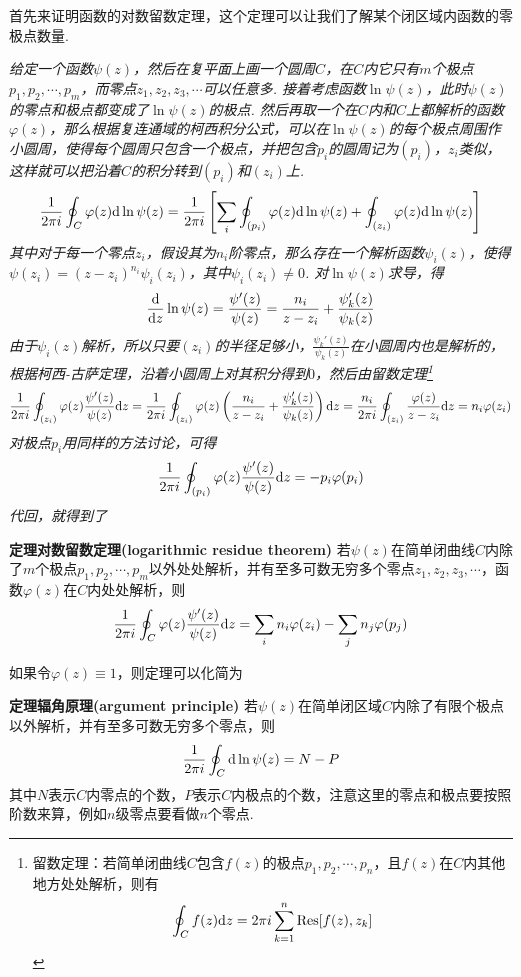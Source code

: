 \documentclass[UTF8]{ctexart}
\newcommand{\trm}[1]{{\rm #1}}
\newenvironment{theorem}[1]
    {\begin{tcolorbox}[enhanced, colback=LightYellow, breakable=true, frame hidden, borderline west={1.5mm}{-2mm}{DarkBlue}]
    {\bfseries {\color{DarkBlue} 定理}\quad #1} \newline}
    {\end{tcolorbox}}
\begin{document}
首先来证明函数的对数留数定理，这个定理可以让我们了解某个闭区域内函数的零极点数量.

\textit{
给定一个函数\(\psi(z)\)，然后在复平面上画一个圆周\(C\)，在\(C\)内它只有\(m\)个极点\(p_1, p_2, \cdots, p_m\)，而零点\(z_1, z_2, z_3, \cdots\)可以任意多. 接着考虑函数\(\ln\psi(z)\)，此时\(\psi(z)\)的零点和极点都变成了\(\ln\psi(z)\)的极点. 然后再取一个在\(C\)内和\(C\)上都解析的函数\(\varphi(z)\)，那么根据复连通域的柯西积分公式，可以在\(\ln\psi(z)\)的每个极点周围作小圆周，使得每个圆周只包含一个极点，并把包含\(p_i\)的圆周记为\((p_i)\)，\(z_i\)类似，这样就可以把沿着\(C\)的积分转到\((p_i)\)和\((z_i)\)上.
\[\frac{1}{2\pi i}\oint_{C}\varphi(z)\trm{d}\ln\psi(z) = \frac{1}{2\pi i}\left[\sum_{i}\oint_{(p_i)}\varphi(z)\trm{d}\ln\psi(z)+\oint_{(z_i)}\varphi(z)\trm{d}\ln\psi(z)\right]\]
其中对于每一个零点\(z_i\)，假设其为\(n_i\)阶零点，那么存在一个解析函数\(\psi_i(z)\)，使得\(\psi(z_i) = (z-z_i)^{n_i}\psi_i(z_i)\)，其中\(\psi_i(z_i)\neq 0\). 对\(\ln\psi(z)\)求导，得
\[\frac{\trm{d}}{\trm{d}z}\ln\psi(z) = \frac{\psi'(z)}{\psi(z)} = \frac{n_i}{z-z_i}+\frac{\psi_k'(z)}{\psi_k(z)}\]
由于\(\psi_i(z)\)解析，所以只要\((z_i)\)的半径足够小，\(\frac{\psi_k'(z)}{\psi_k(z)}\)在小圆周内也是解析的，根据柯西-古萨定理，沿着小圆周上对其积分得到\(0\)，然后由留数定理\footnote{留数定理：若简单闭曲线\(C\)包含\(f(z)\)的极点\(p_1, p_2, \cdots, p_n\)，且\(f(z)\)在\(C\)内其他地方处处解析，则有
\[\oint_C f(z)\trm{d}z = 2\pi i\sum_{k=1}^{n}\trm{Res}[f(z),z_k]\]}
\[\frac{1}{2\pi i}\oint_{(z_i)}\varphi(z)\frac{\psi'(z)}{\psi(z)}\trm{d}z = \frac{1}{2\pi i}\oint_{(z_i)}\varphi(z)\left(\frac{n_i}{z-z_i}+\frac{\psi_k'(z)}{\psi_k(z)}\right)\trm{d}z = \frac{n_i}{2\pi i}\oint_{(z_i)}\frac{\varphi(z)}{z-z_i}\trm{d}z = n_i\varphi(z_i)\]
对极点\(p_i\)用同样的方法讨论，可得
\[\frac{1}{2 \pi i}\oint_{(p_i)}\varphi(z)\frac{\psi'(z)}{\psi(z)}\trm{d}z = -p_i\varphi(p_i)\]
代回，就得到了
}
\begin{theorem}{对数留数定理(logarithmic residue theorem)}
    若\(\psi(z)\)在简单闭曲线\(C\)内除了\(m\)个极点\(p_1, p_2, \cdots, p_m\)以外处处解析，并有至多可数无穷多个零点\(z_1, z_2, z_3, \cdots\)，函数\(\varphi(z)\)在\(C\)内处处解析，则
    \[\frac{1}{2\pi i}\oint_{C}\varphi(z)\frac{\psi'(z)}{\psi(z)}\trm{d}z = \sum_{i}n_i\varphi(z_i) - \sum_{j}n_j\varphi(p_j)\]
\end{theorem}
如果令\(\varphi(z) \equiv 1\)，则定理可以化简为
\begin{theorem}{辐角原理(argument principle)}
    若\(\psi(z)\)在简单闭区域\(C\)内除了有限个极点以外解析，并有至多可数无穷多个零点，则
    \[\frac{1}{2\pi i}\oint_{C}\trm{d}\ln\psi(z) = N-P\]
    其中\(N\)表示\(C\)内零点的个数，\(P\)表示\(C\)内极点的个数，注意这里的零点和极点要按照阶数来算，例如\(n\)级零点要看做\(n\)个零点.
\end{theorem}
\end{document}

